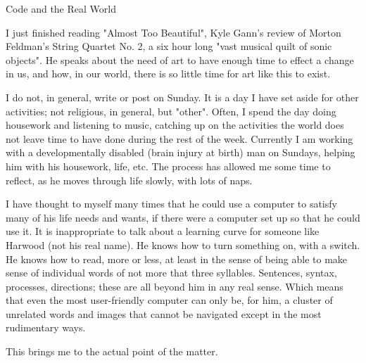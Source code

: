 Code and the Real World

        I just finished reading "Almost Too Beautiful", Kyle Gann's review of Morton Feldman's String Quartet No. 2, a six hour long "vast musical quilt of sonic objects". He speaks about the need of art to have enough time to effect a change in us, and how, in our world, there is so little time for art like this to exist.

        I do not, in general, write or post on Sunday. It is a day I have set aside for other activities; not religious, in general, but "other". Often, I spend the day doing housework and listening to music, catching up on the activities the world does not leave time to have done during the rest of the week. Currently I am working with a developmentally disabled (brain injury at birth) man on Sundays, helping him with his housework, life, etc. The process has allowed me some time to reflect, as he moves through life slowly, with lots of naps.
        
        I have thought to myself many times that he could use a computer to satisfy many of his life needs and wants, if there were a computer set up so that he could use it. It is inappropriate to talk about a learning curve for someone like Harwood (not his real name). He knows how to turn something on, with a switch. He knows how to read, more or less, at least in the sense of being able to make sense of individual words of not more that three syllables. Sentences, syntax, processes, directions; these are all beyond him in any real sense. Which means that even the most user-friendly computer can only be, for him, a cluster of unrelated words and images that cannot be navigated except in the most rudimentary ways.
        
        This brings me to the actual point of the matter.
        
